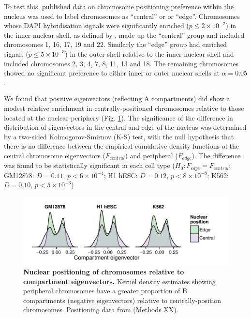 \documentclass[a4paper,10pt,oneside]{book}
\begin{document}
To test this, published data on chromosome positioning preference within
the nucleus was used to label chromosomes as ``central'' or 
or ``edge''.\cite{Boyle2001} Chromosomes whose DAPI hybridisation
signals were significantly enriched ($p\leq 2\times10^{-2}$) in the inner nuclear shell, as
defined by \citet{Boyle2001}, made up the ``central''
group and included chromosomes 1, 16, 17, 19 and 22. Similarly the ``edge'' group
had enriched signals ($p\leq 5\times10^{-3}$) in the outer shell relative to the inner nuclear
shell and included chromosomes 2, 3, 4, 7, 8, 11, 13 and 18. The remaining
chromosomes showed no significant preference to either inner or
outer nuclear shells at $\alpha = 0.05$.\cite{Boyle2001} 

We found that positive eigenvectors (reflecting A compartments) did show a modest relative enrichment in centrally-positioned chromosomes relative to those located at the nuclear periphery (Fig. \ref{fig:nucpos}). The significance
of the difference in distribution of eigenvectors in the central
and edge of the nucleus was determined by a two-sided Kolmogorov-Smirnov (K-S)
test, with the null hypothesis that there is no difference between the empirical cumulative
density functions of the central chromosome eigenvectors ($F_{central}$)
and peripheral ($F_{edge}$). The difference was found to be statistically significant in each cell type ($H_0: F_{edge} = F_{central}$; GM12878: $D = 0.11$, $p < 6 \times 10^{-4}$; H1 hESC: $D = 0.12$, $p < 8 \times 10^{-8}$; K562: $D = 0.10$, $p < 5 \times 10^{-3}$)

\begin{figure}
\begin{center} 
\includegraphics[width=\textwidth]{figs/nucpos.pdf}
\captionsetup{width=\textwidth} 
\caption{ {\bf Nuclear positioning of chromosomes relative to compartment eigenvectors. }
Kernel density estimates showing peripheral chromosomes have a greater proportion of B compartments (negative eigenvectors) relative to centrally-position chromosomes. Positioning data from \citet{Boyle2001} (Methods XX).
}\label{fig:nucpos}
\end{center} 
\end{figure} 


\ifstandalone
\begin{small}

\end{small}
\fi
\end{document}
